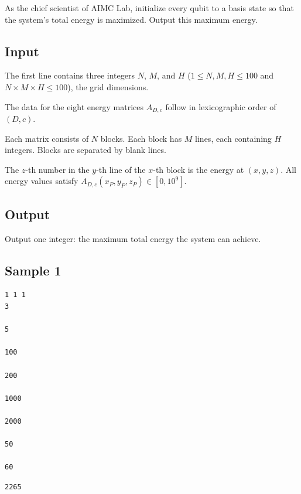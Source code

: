 As the chief scientist of AIMC Lab, initialize every qubit to a basis state so that the system's total energy is maximized. Output this maximum energy.

\subsection{Input}

The first line contains three integers $N$, $M$, and $H$ ($1 \le N,M,H \le 100$ and $N \times M \times H \le 100$), the grid dimensions.

The data for the eight energy matrices $A_{D,c}$ follow in lexicographic order of $(D,c)$.

Each matrix consists of $N$ blocks. Each block has $M$ lines, each containing $H$ integers. Blocks are separated by blank lines.

The $z$-th number in the $y$-th line of the $x$-th block is the energy at $(x,y,z)$. All energy values satisfy $A_{D,c}(x_P,y_P,z_P) \in [0,10^9]$.

\subsection{Output}

Output one integer: the maximum total energy the system can achieve.

\subsection{Sample 1}

\begin{minipage}{\linewidth}
	\begin{minipage}[t]{0.49\linewidth}
		\begin{lstlisting}[title=\texttt{standard input}]
1 1 1
3

5

100

200

1000

2000

50

60
\end{lstlisting}
	\end{minipage}
	\begin{minipage}[t]{0.49\linewidth}
		\begin{lstlisting}[title=\texttt{standard output}]
2265
\end{lstlisting}
	\end{minipage}
\end{minipage}


